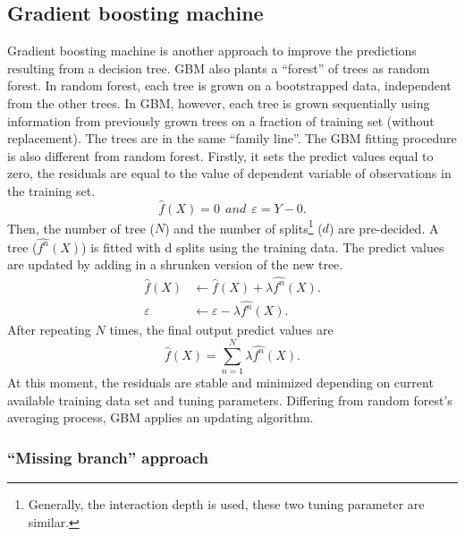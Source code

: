 

\subsection{Gradient boosting machine}

Gradient boosting machine \citep[GBM,][]{Friedman2001,Friedman2002} is another approach to improve the predictions resulting from a decision tree. GBM also plants a ``forest'' of trees as random forest. In random forest, each tree is grown on a bootstrapped data, independent from the other trees. In GBM, however, each tree is grown sequentially using information from previously grown trees on a fraction of training set (without replacement). The trees are in the same ``family line''. The GBM fitting procedure is also different from random forest. Firstly, it sets the predict values equal to zero, the residuals are equal to the value of dependent variable of observations in the training set.
\begin{equation}
\hat{f}(X) = 0~~and~~\varepsilon = Y - 0.
\end{equation}
Then, the number of tree ($N$) and the number of splits\footnote{Generally, the interaction depth is used, these two tuning parameter are similar.} ($d$) are pre-decided. A tree ($\hat{f^n}(X)$) is fitted with d splits using the training data.  The predict values are updated by adding in a shrunken version of the new tree.
\begin{equation}
\begin{split}
\hat{f}(X) &\leftarrow \hat{f}(X) + \lambda\hat{f^n}(X).\\
\varepsilon &\leftarrow \varepsilon - \lambda\hat{f^n}(X).
\end{split}
\end{equation}
After repeating $N$ times, the final output predict values are
\begin{equation}
\hat{f}(X) = \sum_{n=1}^N \lambda\hat{f^n}(X).
\end{equation}
At this moment, the residuals are stable and minimized depending on current available training data set and tuning parameters. Differing from random forest's averaging process, GBM applies an updating algorithm.

\subsubsection*{``Missing branch'' approach}

